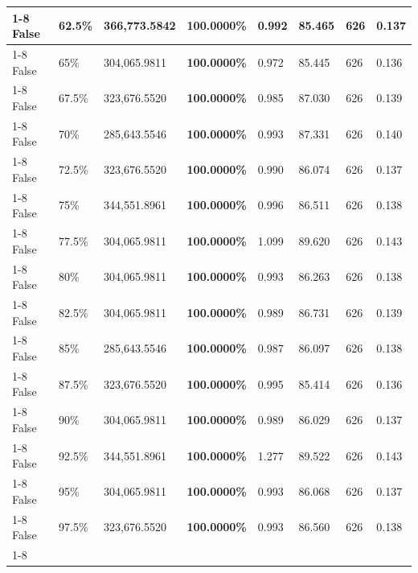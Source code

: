 \begin{table}[H]
\begin{tabular}{lllrllll}
\cline{1-8} \cline{2-8}
False & 62.5\% & 366,773.5842 & \bfseries \color{red} 100.0000\% & 0.992 & 85.465 & 626 & 0.137 \\
\cline{1-8} \cline{2-8}
False & 65\% & 304,065.9811 & \bfseries \color{red} 100.0000\% & 0.972 & 85.445 & 626 & 0.136 \\
\cline{1-8} \cline{2-8}
False & 67.5\% & 323,676.5520 & \bfseries \color{red} 100.0000\% & 0.985 & 87.030 & 626 & 0.139 \\
\cline{1-8} \cline{2-8}
False & 70\% & \color{red} 285,643.5546 & \bfseries \color{red} 100.0000\% & 0.993 & 87.331 & 626 & 0.140 \\
\cline{1-8} \cline{2-8}
False & 72.5\% & 323,676.5520 & \bfseries \color{red} 100.0000\% & 0.990 & 86.074 & 626 & 0.137 \\
\cline{1-8} \cline{2-8}
False & 75\% & 344,551.8961 & \bfseries \color{red} 100.0000\% & 0.996 & 86.511 & 626 & 0.138 \\
\cline{1-8} \cline{2-8}
False & 77.5\% & 304,065.9811 & \bfseries \color{red} 100.0000\% & 1.099 & 89.620 & 626 & 0.143 \\
\cline{1-8} \cline{2-8}
False & 80\% & 304,065.9811 & \bfseries \color{red} 100.0000\% & 0.993 & 86.263 & 626 & 0.138 \\
\cline{1-8} \cline{2-8}
False & 82.5\% & 304,065.9811 & \bfseries \color{red} 100.0000\% & 0.989 & 86.731 & 626 & 0.139 \\
\cline{1-8} \cline{2-8}
False & 85\% & \color{red} 285,643.5546 & \bfseries \color{red} 100.0000\% & 0.987 & 86.097 & 626 & 0.138 \\
\cline{1-8} \cline{2-8}
False & 87.5\% & 323,676.5520 & \bfseries \color{red} 100.0000\% & 0.995 & 85.414 & 626 & 0.136 \\
\cline{1-8} \cline{2-8}
False & 90\% & 304,065.9811 & \bfseries \color{red} 100.0000\% & 0.989 & 86.029 & 626 & 0.137 \\
\cline{1-8} \cline{2-8}
False & 92.5\% & 344,551.8961 & \bfseries \color{red} 100.0000\% & 1.277 & 89.522 & 626 & 0.143 \\
\cline{1-8} \cline{2-8}
False & 95\% & 304,065.9811 & \bfseries \color{red} 100.0000\% & 0.993 & 86.068 & 626 & 0.137 \\
\cline{1-8} \cline{2-8}
False & 97.5\% & 323,676.5520 & \bfseries \color{red} 100.0000\% & 0.993 & 86.560 & 626 & 0.138 \\
\cline{1-8} \cline{2-8}
\bottomrule
\end{tabular}
\end{table}
